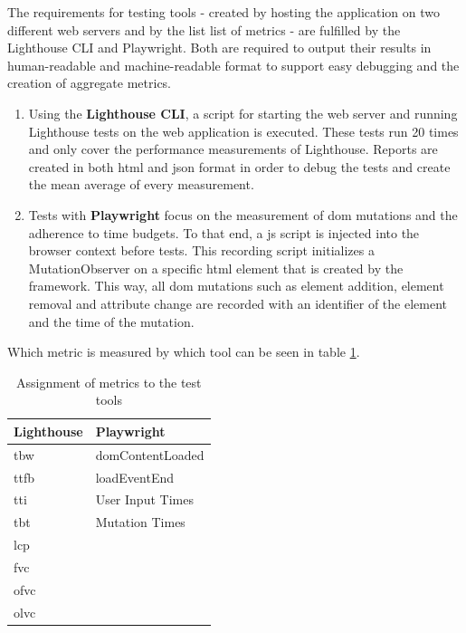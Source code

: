 \documentclass[a4paper, 12pt]{article}
\begin{document}
The requirements for testing tools - created by hosting the application on two different web servers and by the list list of metrics - are fulfilled by the Lighthouse CLI and Playwright.
Both are required to output their results in human-readable and machine-readable format to support easy debugging and the creation of aggregate metrics.

\begin{enumerate}
  \item Using the \textbf{Lighthouse CLI}, a script for starting the web server and running Lighthouse tests on the web application is executed.
  These tests run 20 times and only cover the performance measurements of Lighthouse.
  Reports are created in both \acrshort{html} and \acrshort{json} format in order to debug the tests and create the mean average of every measurement.
  \item Tests with \textbf{Playwright} focus on the measurement of \acrshort{dom} mutations and the adherence to time budgets.
  To that end, a \acrshort{js} script is injected into the browser context before tests.
  This recording script initializes a MutationObserver on a specific \acrshort{html} element that is created by the framework.
  This way, all \acrshort{dom} mutations such as element addition, element removal and attribute change are recorded with an identifier of the element and the time of the mutation.
\end{enumerate}

Which metric is measured by which tool can be seen in table \ref{tab:metricassignment}.

\begin{table}[h]
  \begin{center}
    \begin{tabular}{|l|l|}
      \hline
      \textbf{Lighthouse} & \textbf{Playwright} \\ \hline
      \acrfull{tbw}       & domContentLoaded    \\ \hline
      \acrfull{ttfb}      & loadEventEnd        \\ \hline
      \acrfull{tti}       & User Input Times    \\ \hline
      \acrfull{tbt}       & Mutation Times      \\ \hline
      \acrfull{lcp}       &                     \\ \hline
      \acrfull{fvc}       &                     \\ \hline
      \acrfull{ofvc}      &                     \\ \hline
      \acrfull{olvc}      &                     \\ \hline
    \end{tabular}
  \end{center}
  \caption{Assignment of metrics to the test tools}
  \label{tab:metricassignment}
\end{table}
\end{document}
